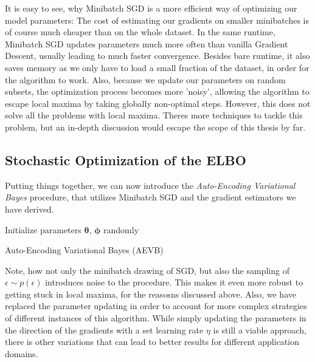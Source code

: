 \documentclass[12pt]{report}
\theoremstyle{definition}
\begin{document}
It is easy to see, why Minibatch SGD is a more efficient way of optimizing our model parameters: The cost of estimating our gradients on smaller minibatches is of course much cheaper than on the whole dataset. In the same runtime, Minibatch SGD updates parameters much more often than vanilla Gradient Descent, usually leading to much faster convergence. Besides bare runtime, it also saves memory as we only have to load a small fraction of the dataset, in order for the algorithm to work. Also, because we update our parameters on random subsets, the optimization process becomes more 'noisy', allowing the algorithm to escape local maxima by taking globally non-optimal steps. However, this does not solve all the problems with local maxima. Theres more techniques to tackle this problem, but an in-depth discussion would escape the scope of this thesis by far.

\subsection{Stochastic Optimization of the ELBO}
Putting things together, we can now introduce the \emph{Auto-Encoding Variational Bayes} procedure, that utilizes Minibatch SGD and the gradient estimators we have derived.

\begin{algorithm}[H]
\SetAlgoLined
Initialize parameters $\pmb{\theta}$, $\pmb{\phi}$ randomly\\
\caption{Auto-Encoding Variational Bayes (AEVB)}
\end{algorithm}
Note, how not only the minibatch drawing of SGD, but also the sampling of $\epsilon \sim p(\epsilon)$ introduces noise to the procedure. This makes it even more robust to getting stuck in local maxima, for the reasosns discussed above. Also, we have replaced the parameter updating in order to account for more complex strategies of different instances of this algorithm. While simply updating the parameters in the direction of the gradients with a set learning rate $\eta$ is still a viable approach, there is other variations that can lead to better results for different application domains.
\end{document}
